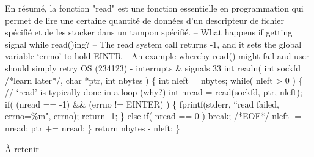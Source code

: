 \documentclass[12pt]{article}
\begin{document}
En résumé, la fonction "read" est une fonction essentielle en programmation qui permet de lire une certaine quantité de données d'un descripteur de fichier spécifié et de les stocker dans un tampon spécifié.
– What happens if getting signal while read()ing?
– The read system call returns -1, and it sets the global variable ‘errno’
to hold EINTR
– An example whereby read() might fail and user should simply retry
OS (234123) - interrupts \& signals
33
int readn( int sockfd /*learn later*/, char *ptr, int nbytes )
\{
int nleft = nbytes;
while( nleft > 0 ) \{ // ‘read’ is typically done in a loop (why?)
int nread = read(sockfd, ptr, nleft);
if( (nread == -1) \&\& (errno != EINTER) ) \{
fprintf(stderr, “read failed, errno=\%m", errno);
return -1;
\}
else if( nread == 0 )
break; /*EOF*/
nleft -= nread;
ptr   += nread;
\}
return nbytes - nleft;
\}
\begin{aretenir}{À retenir}
\end{aretenir}
\end{document}

